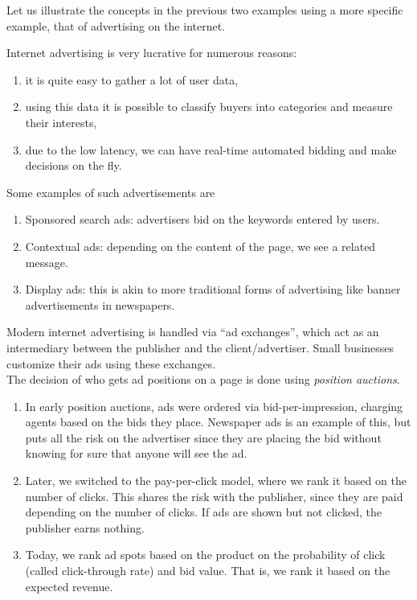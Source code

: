 		Let us illustrate the concepts in the previous two examples using a more specific example, that of advertising on the internet.

		\begin{fex}
			Internet advertising is very lucrative for numerous reasons: 
			\begin{enumerate}
				\item it is quite easy to gather a lot of user data,
				\item using this data it is possible to classify buyers into categories and measure their interests,
				\item due to the low latency, we can have real-time automated bidding and make decisions on the fly.
			\end{enumerate}
			Some examples of such advertisements are
			\begin{enumerate}
				\item Sponsored search ads: advertisers bid on the keywords entered by users.
				\item Contextual ads: depending on the content of the page, we see a related message.
				\item Display ads: this is akin to more traditional forms of advertising like banner advertisements in newspapers.
			\end{enumerate}
			Modern internet advertising is handled via ``ad exchanges'', which act as an intermediary between the publisher and the client/advertiser. Small businesses customize their ads using these exchanges.\\
			The decision of who gets ad positions on a page is done using \emph{position auctions}.
			\begin{enumerate}
				\item In early position auctions, ads were ordered via bid-per-impression, charging agents based on the bids they place. Newspaper ads is an example of this, but puts all the risk on the advertiser since they are placing the bid without knowing for sure that anyone will see the ad.
				\item Later, we switched to the pay-per-click model, where we rank it based on the number of clicks. This shares the risk with the publisher, since they are paid depending on the number of clicks. If ads are shown but not clicked, the publisher earns nothing.
				\item Today, we rank ad spots based on the product on the probability of click (called click-through rate) and bid value. That is, we rank it based on the expected revenue.
			\end{enumerate}
		\end{fex}

